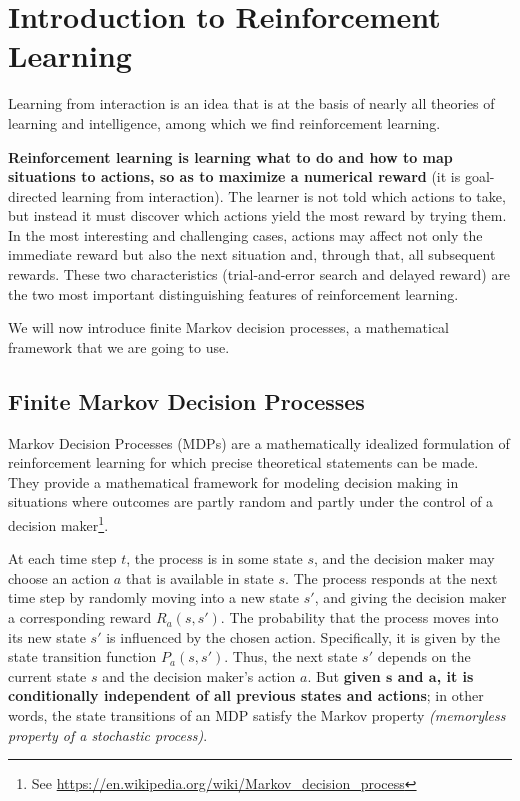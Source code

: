 \chapter{Introduction to Reinforcement Learning}
Learning from interaction is an idea that is at the basis of nearly all theories of learning and intelligence, among which we find reinforcement learning.

\textbf{Reinforcement learning is learning what to do and how to map situations to actions, so as to maximize a numerical reward} (it is goal-directed learning from interaction). The learner is not told which actions to take, but instead it must discover which actions yield the most reward by trying them. In the most interesting and challenging cases, actions may affect not only the immediate reward but also the next situation and, through that, all subsequent rewards. These two characteristics (trial-and-error search and delayed reward) are the two most important distinguishing features of reinforcement learning.

We will now introduce finite Markov decision processes, a mathematical framework that we are going to use.

\section{Finite Markov Decision Processes}
Markov Decision Processes (MDPs) are a mathematically idealized formulation of reinforcement learning for which precise theoretical statements can be made. They provide a mathematical framework for modeling decision making in situations where outcomes are partly random and partly under the control of a decision maker\footnote{See \url{https://en.wikipedia.org/wiki/Markov_decision_process}}.

At each time step $t$, the process is in some state $s$, and the decision maker may choose an action $a$ that is available in state $s$. The process responds at the next time step by randomly moving into a new state $s'$, and giving the decision maker a corresponding reward $R_a(s,s')$. The probability that the process moves into its new state $s'$ is influenced by the chosen action. Specifically, it is given by the state transition function $P_a(s,s')$. Thus, the next state $s'$ depends on the current state $s$ and the decision maker's action $a$. But \textbf{given $\boldsymbol{s}$ and $\boldsymbol{a}$, it is conditionally independent of all previous states and actions}; in other words, the state transitions of an MDP satisfy the Markov property \textit{(memoryless property of a stochastic process)}.

